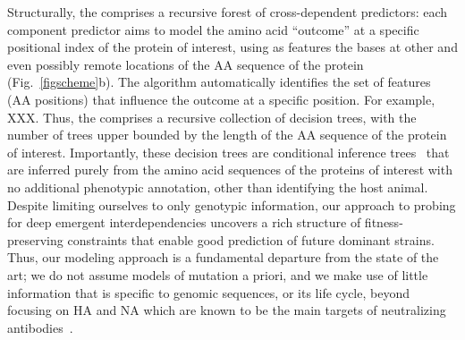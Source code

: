 \documentclass[onecolumn, compsoc,10pt]{IEEEtran}
\begin{document}
Structurally, the \enet comprises a recursive forest of  cross-dependent predictors: each component predictor aims to model the amino acid ``outcome'' at a specific positional index of the protein of interest, using as features   the bases  at other and even possibly remote locations of the AA sequence of the protein (Fig.~\ref{figscheme}b). The algorithm automatically identifies the set of features (AA positions) that influence the outcome at a specific position. For example, XXX. Thus, the \enet comprises a  recursive collection of decision trees, with the number of trees upper bounded by the length of the AA sequence of the protein of interest. Importantly, these decision trees are conditional inference trees~\cite{Hothorn06unbiasedrecursive} that are%
inferred purely from the amino acid sequences of the proteins of interest with no additional phenotypic annotation, other than identifying the host animal. Despite limiting ourselves to only genotypic information, our approach to probing for deep emergent interdependencies   uncovers a rich structure of fitness-preserving constraints that enable good prediction of future dominant strains. Thus, our modeling approach is a fundamental departure from the state of the art; we do not assume models of mutation a priori, and we make use of little information that is specific to \infl genomic sequences, or its life cycle, beyond focusing on HA and NA which are known to be the main targets of neutralizing antibodies~\cite{shao2017evolution}.


\end{document}
